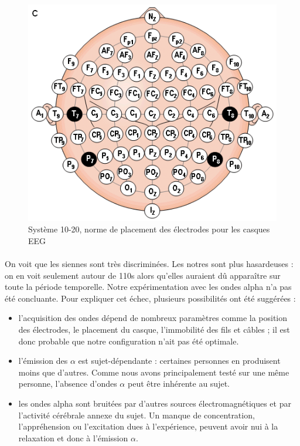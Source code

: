 \documentclass[11pt,a4paper]{article}
\theoremstyle{plain}
\theoremstyle{definition}
\begin{document}
\begin{figure}[h!]
\centering
\includegraphics[scale=0.4]{images/1020.png}
\caption{Système 10-20, norme de placement des électrodes pour les casques EEG}
\label{dix}
\end{figure}

\paragraph{} On voit que les siennes sont très discriminées. Les notres sont plus hasardeuses : on en voit seulement autour de 110s alors qu'elles auraient dû apparaître sur toute la période temporelle. Notre expérimentation avec les ondes alpha n'a pas été concluante. Pour expliquer cet échec, plusieurs possibilités ont été suggérées :
\begin{itemize}
	\item l'acquisition des ondes dépend de nombreux paramètres comme la position des électrodes, le placement du casque, l'immobilité des fils et câbles ; il est donc probable que notre configuration n'ait pas été optimale.
	\item l'émission des $\alpha$ est sujet-dépendante : certaines personnes en produisent moins que d'autres. Comme nous avons principalement testé sur une même personne, l'absence d'ondes $\alpha$ peut être inhérente au sujet.
	\item les ondes alpha sont bruitées par d'autres sources électromagnétiques et par l'activité cérébrale annexe du sujet. Un manque de concentration, l'appréhension ou l'excitation dues à l'expérience, peuvent avoir nui à la relaxation et donc à l'émission $\alpha$.
\end{itemize}
\end{document}
